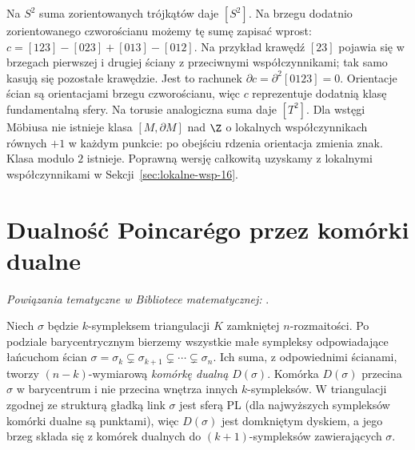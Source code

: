 \begin{przyklad}
Na $S^2$ suma zorientowanych
trójkątów daje $[S^2]$.
Na brzegu dodatnio zorientowanego czworościanu
możemy tę sumę zapisać wprost:
$c=[123]-[023]+[013]-[012]$.
Na przykład krawędź $[23]$ pojawia się w brzegach
pierwszej i drugiej ściany z przeciwnymi współczynnikami;
tak samo kasują się pozostałe krawędzie.
Jest to rachunek $\partial c=\partial^2[0123]=0$.
Orientacje ścian są orientacjami brzegu czworościanu,
więc $c$ reprezentuje dodatnią klasę fundamentalną sfery.
Na torusie analogiczna suma
daje $[T^2]$. Dla wstęgi
Möbiusa nie istnieje
klasa $[M,\partial M]$ nad $\Z$
o lokalnych współczynnikach
równych $+1$ w każdym punkcie:
po obejściu rdzenia orientacja
zmienia znak. Klasa modulo $2$
istnieje. Poprawną wersję
całkowitą uzyskamy z lokalnymi
współczynnikami w
Sekcji~\ref{sec:lokalne-wsp-16}.
\end{przyklad}

\section{Dualność Poincarégo przez komórki dualne}
\label{sec:dualnosc-komorkowa-16}

\noindent\emph{Powiązania tematyczne w Bibliotece matematycznej:} .


Niech $\sigma$ będzie $k$-sympleksem
triangulacji $K$ zamkniętej
$n$-rozmaitości. Po podziale
barycentrycznym bierzemy wszystkie
małe sympleksy odpowiadające
łańcuchom ścian
$\sigma=\sigma_k\subsetneq
\sigma_{k+1}\subsetneq\cdots
\subsetneq\sigma_n$.
Ich suma, z odpowiednimi
ścianami, tworzy
$(n-k)$-wymiarową
\emph{komórkę dualną} $D(\sigma)$.
Komórka $D(\sigma)$ przecina
$\sigma$ w barycentrum i nie
przecina wnętrza innych
$k$-sympleksów. W triangulacji zgodnej ze strukturą gładką link
$\sigma$ jest sferą PL (dla najwyższych sympleksów
komórki dualne są punktami), więc
$D(\sigma)$ jest domkniętym
dyskiem, a jego brzeg składa
się z komórek dualnych do
$(k+1)$-sympleksów
zawierających $\sigma$.

